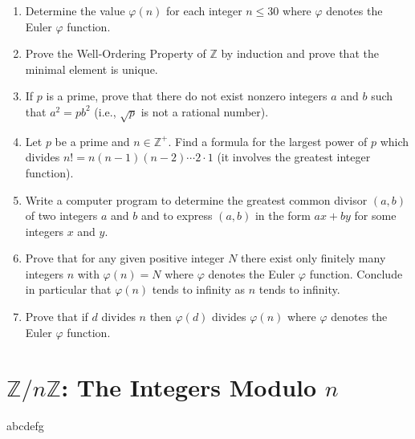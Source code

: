 \begin{enumerate}
    \item Determine the value $\varphi(n)$ for each integer $n \leq 30$ where $\varphi$ denotes the Euler $\varphi$ function.

    \item Prove the Well-Ordering Property of $\mathbb{Z}$ by induction and prove that the minimal element is unique.

    \item If $p$ is a prime, prove that there do not exist nonzero integers $a$ and $b$ such that $a^2 = p b^2$ (i.e., $\sqrt{p}$ is not a rational number).

    \item Let $p$ be a prime and $n \in \mathbb{Z}^+$. Find a formula for the largest power of $p$ which divides $n! = n(n - 1)(n - 2)\cdots 2 \cdot 1$ (it involves the greatest integer function).

    \item Write a computer program to determine the greatest common divisor $(a, b)$ of two integers $a$ and $b$ and to express $(a, b)$ in the form $ax + by$ for some integers $x$ and $y$.

    \item Prove that for any given positive integer $N$ there exist only finitely many integers $n$ with $\varphi(n) = N$ where $\varphi$ denotes the Euler $\varphi$ function. Conclude in particular that $\varphi(n)$ tends to infinity as $n$ tends to infinity.

    \item Prove that if $d$ divides $n$ then $\varphi(d)$ divides $\varphi(n)$ where $\varphi$ denotes the Euler $\varphi$ function.
\end{enumerate}
\section{$\mathbb{Z}/n\mathbb{Z}$: The Integers Modulo $n$}
abcdefg
